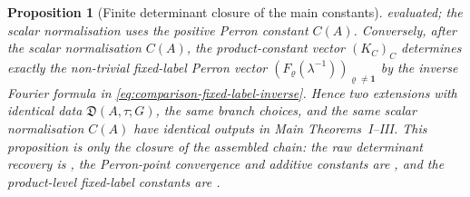 \documentclass[11pt,a4paper]{amsart}
\theoremstyle{plain}
\newtheorem{proposition}[theorem]{Proposition}
\theoremstyle{definition}
\theoremstyle{remark}
\begin{document}
\begin{proposition}[Finite determinant closure of the main constants]
  evaluated; the scalar normalisation uses the positive Perron constant
  \(C(A)\).  Conversely, after the scalar normalisation
  \(C(A)\), the product-constant vector \((K_C)_C\) determines exactly the
  non-trivial fixed-label Perron vector
  \((F_\varrho(\lambda^{-1}))_{\varrho\ne\mathbf1}\) by the inverse
  Fourier formula in \eqref{eq:comparison-fixed-label-inverse}.
  Hence two extensions with identical data \(\mathfrak D(A,\tau;G)\), the
  same branch choices, and the same scalar normalisation \(C(A)\) have
  identical outputs in Main Theorems~I--III.  This proposition is only the
  closure of the assembled chain: the raw determinant recovery is
  ,
  the Perron-point convergence and additive constants are
  , and the
  product-level fixed-label constants are
  .
\end{proposition}
\end{document}
